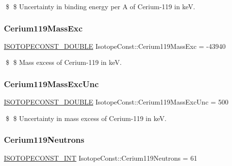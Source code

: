\$ \$ Uncertainty in binding energy per A of Cerium-\/119 in keV. \mbox{\label{group___isotope_const-_cerium-_ce119_ga7904bd8f02a5cfb9bf08c1a69756ab82}} 
\subsubsection{\texorpdfstring{Cerium119\+Mass\+Exc}{Cerium119MassExc}}
{\footnotesize\ttfamily \mbox{\hyperlink{group___isotope_const-_macros_ga8f45a7272ce02c0b4c65c44636ed719a}{I\+S\+O\+T\+O\+P\+E\+C\+O\+N\+S\+T\+\_\+\+D\+O\+U\+B\+LE}} Isotope\+Const\+::\+Cerium119\+Mass\+Exc = -\/43940}

\$ \$ Mass excess of Cerium-\/119 in keV. \mbox{\label{group___isotope_const-_cerium-_ce119_ga25c0a0e6e7eee45eac4b60e88bef4b08}} 
\subsubsection{\texorpdfstring{Cerium119\+Mass\+Exc\+Unc}{Cerium119MassExcUnc}}
{\footnotesize\ttfamily \mbox{\hyperlink{group___isotope_const-_macros_ga8f45a7272ce02c0b4c65c44636ed719a}{I\+S\+O\+T\+O\+P\+E\+C\+O\+N\+S\+T\+\_\+\+D\+O\+U\+B\+LE}} Isotope\+Const\+::\+Cerium119\+Mass\+Exc\+Unc = 500}

\$ \$ Uncertainty in mass excess of Cerium-\/119 in keV. \mbox{\label{group___isotope_const-_cerium-_ce119_gaa93fc532b0c6e2cd9dea63447b3b65de}} 
\subsubsection{\texorpdfstring{Cerium119\+Neutrons}{Cerium119Neutrons}}
{\footnotesize\ttfamily \mbox{\hyperlink{group___isotope_const-_macros_ga5f18360b3e99483a35c32d789e62621c}{I\+S\+O\+T\+O\+P\+E\+C\+O\+N\+S\+T\+\_\+\+I\+NT}} Isotope\+Const\+::\+Cerium119\+Neutrons = 61}

